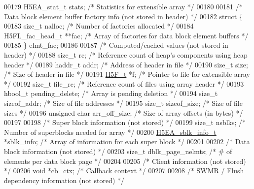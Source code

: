 \begin{DoxyCode}
00179     H5EA\_stat\_t stats;                  \textcolor{comment}{/* Statistics for extensible array */}
00180 
00181     \textcolor{comment}{/* Data block element buffer factory info (not stored in header) */}
00182     \textcolor{keyword}{struct }\{
00183         \textcolor{keywordtype}{size\_t} nalloc;                  \textcolor{comment}{/* Number of factories allocated */}
00184         H5FL\_fac\_head\_t **fac;          \textcolor{comment}{/* Array of factories for data block element buffers */}
00185     \} elmt\_fac;
00186 
00187     \textcolor{comment}{/* Computed/cached values (not stored in header) */}
00188     \textcolor{keywordtype}{size\_t} rc;                          \textcolor{comment}{/* Reference count of heap's components using heap header */}
00189     haddr\_t addr;                       \textcolor{comment}{/* Address of header in file */}
00190     \textcolor{keywordtype}{size\_t} size;                        \textcolor{comment}{/* Size of header in file */}
00191     \hyperlink{struct_h5_f__t}{H5F\_t} *f;                           \textcolor{comment}{/* Pointer to file for extensible array */}
00192     \textcolor{keywordtype}{size\_t} file\_rc;                     \textcolor{comment}{/* Reference count of files using array header */}
00193     hbool\_t pending\_delete;             \textcolor{comment}{/* Array is pending deletion */}
00194     \textcolor{keywordtype}{size\_t} sizeof\_addr;                 \textcolor{comment}{/* Size of file addresses */}
00195     \textcolor{keywordtype}{size\_t} sizeof\_size;                 \textcolor{comment}{/* Size of file sizes */}
00196     \textcolor{keywordtype}{unsigned} \textcolor{keywordtype}{char} arr\_off\_size;         \textcolor{comment}{/* Size of array offsets (in bytes) */}
00197 
00198     \textcolor{comment}{/* Super block information (not stored) */}
00199     \textcolor{keywordtype}{size\_t} nsblks;                      \textcolor{comment}{/* Number of superblocks needed for array */}
00200     \hyperlink{struct_h5_e_a__sblk__info__t}{H5EA\_sblk\_info\_t} *sblk\_info;        \textcolor{comment}{/* Array of information for each super block */}
00201 
00202     \textcolor{comment}{/* Data block information (not stored) */}
00203     \textcolor{keywordtype}{size\_t} dblk\_page\_nelmts;            \textcolor{comment}{/* # of elements per data block page */}
00204 
00205     \textcolor{comment}{/* Client information (not stored) */}
00206     \textcolor{keywordtype}{void} *cb\_ctx;                       \textcolor{comment}{/* Callback context */}
00207 
00208     \textcolor{comment}{/* SWMR / Flush dependency information (not stored) */}

\end{DoxyCode}
